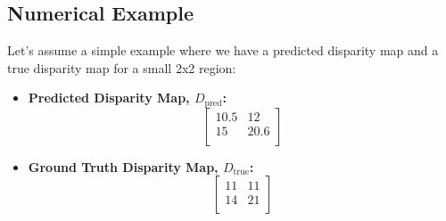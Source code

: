 \documentclass[22pt]{report}
\begin{document}
\subsection*{Numerical Example}
Let's assume a simple example where we have a predicted disparity map and a true disparity map for a small 2x2 region:
\begin{itemize}
    \item \textbf{Predicted Disparity Map, \( D_{\text{pred}} \):}
            \[
            \begin{bmatrix}
            10.5 & 12 \\
            15 & 20.6 \\
            \end{bmatrix}
            \]
    \item \textbf{Ground Truth Disparity Map, \( D_{\text{true}} \):}
            \[
            \begin{bmatrix}
            11 & 11 \\
            14 & 21 \\
            \end{bmatrix}
            \]
            
\end{itemize}
\vspace{15}
\end{document}
